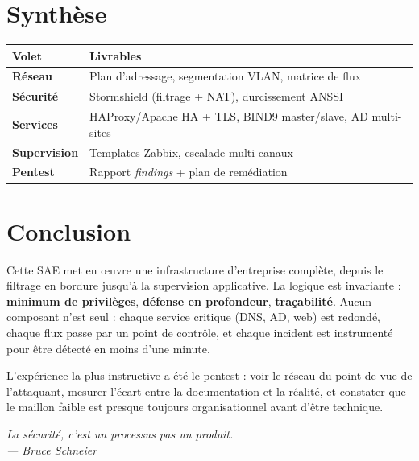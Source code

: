 \documentclass[11pt,a4paper]{article}
\begin{document}
\section{Synthèse}

\renewcommand{\arraystretch}{1.35}
\begin{tabularx}{\linewidth}{@{}>{\bfseries}p{3.5cm} X@{}}
\toprule
\rowcolor{light} Volet & Livrables \\ \midrule
Réseau      & Plan d'adressage, segmentation VLAN, matrice de flux \\
Sécurité    & Stormshield (filtrage + NAT), durcissement ANSSI \\
Services    & HAProxy/Apache HA + TLS, BIND9 master/slave, AD multi-sites \\
Supervision & Templates Zabbix, escalade multi-canaux \\
Pentest     & Rapport \textit{findings} + plan de remédiation \\
\bottomrule
\end{tabularx}

\section{Conclusion}

Cette SAE met en \oe{}uvre une infrastructure d'entreprise complète, depuis le filtrage en bordure jusqu'à la supervision applicative. La logique est invariante : \textbf{minimum de privilèges}, \textbf{défense en profondeur}, \textbf{traçabilité}. Aucun composant n'est seul : chaque service critique (DNS, AD, web) est redondé, chaque flux passe par un point de contrôle, et chaque incident est instrumenté pour être détecté en moins d'une minute.

\medskip
L'expérience la plus instructive a été le pentest : voir le réseau du point de vue de l'attaquant, mesurer l'écart entre la documentation et la réalité, et constater que le maillon faible est presque toujours organisationnel avant d'être technique.

\vspace{0.5cm}
\begin{center}
{\sffamily\itshape\color{midgray}\large
\og La sécurité, c'est un processus \textemdash{} pas un produit. \fg{} \\ \small{— Bruce Schneier}}
\end{center}
\end{document}
